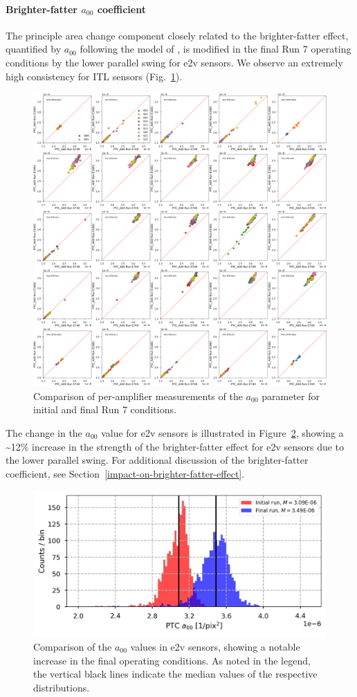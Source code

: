 \paragraph{Brighter-fatter $a_{00}$ coefficient}\label{final-brighter-fatter-a00-coefficient}

The principle area change component closely related to the brighter-fatter effect, quantified by $a_{00}$ following the model of \cite{2019A&A...629A..36A}, is modified in the final Run 7 operating conditions by the lower parallel swing for e2v sensors. We observe an extremely high consistency for ITL sensors (Fig.~\ref{fig:finalChar-PTC_A00_5x5}).

\begin{figure}[ht]
    \centering
    \includegraphics[width=0.7\linewidth]{figures/finalCharacterization/E749_E1881_PTC_A00.png}
    \caption{Comparison of per-amplifier measurements of the $a_{00}$ parameter for initial and final Run 7 conditions.}
    \label{fig:finalChar-PTC_A00_5x5}
\end{figure}

The change in the $a_{00}$ value for e2v sensors is illustrated in Figure~\ref{fig:finalChar-PTC_A00_E2VComp}, showing a \textasciitilde12\% increase in the strength of the brighter-fatter effect for e2v sensors due to the lower parallel swing. For additional discussion of the brighter-fatter coefficient, see Section~\ref{impact-on-brighter-fatter-effect}.

\begin{figure}[ht]
    \centering
    \includegraphics[width=0.7\linewidth]{figures/finalCharacterization/PTCA00Comp.jpg}
    \caption{Comparison of the $a_{00}$ values in e2v sensors, showing a notable increase in the final operating conditions.  As noted in the legend, the vertical black lines indicate the median values of the respective distributions.}
    \label{fig:finalChar-PTC_A00_E2VComp}
\end{figure}

